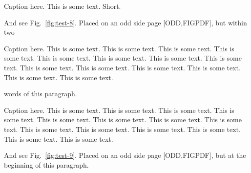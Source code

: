 \documentclass[12pt,a5paper]{book}
\begin{document}
\begin{fullpagefigure}
  \figcapmaxheight{10em}
  \caption{Caption here. This is some text. Short.}
  \label{fig:test-7}
\end{fullpagefigure}

\lipsum[5-11]


\cleardoublepage
\lipsum[1-3]

{\def\FloatBarrier{}
And see Fig.~\ref{fig:test-8}. Placed on an odd side page [ODD,FIGPDF], but within two%
%
\begin{fullpagefigure}
  \caption{Caption here. This is some text. This is some text. This is some text. This is
    some text. This is some text. This is some text. This is some text. This is some
    text. This is some text. This is some text. This is some text. This is some text. This
    is some text. This is some text. }
  \label{fig:test-8}
\end{fullpagefigure}%
%
words of this paragraph.}

\lipsum[5-7]

\cleardoublepage
\lipsum[1-3]

\begin{fullpagefigure}
  \caption{Caption here. This is some text. This is some text. This is some text. This is
    some text. This is some text. This is some text. This is some text. This is some
    text. This is some text. This is some text. This is some text. This is some text. This
    is some text. This is some text. }
  \label{fig:test-9}
\end{fullpagefigure}
And see Fig.~\ref{fig:test-9}. Placed on an odd side page [ODD,FIGPDF], but at the
beginning of this paragraph.

\lipsum[5-7]
\end{document}
